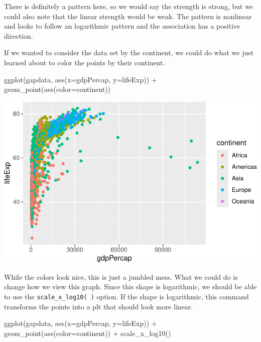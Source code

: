 \documentclass[
  letterpaper,
  DIV=11,
  numbers=noendperiod]{scrreprt}
\newenvironment{Shaded}{\begin{snugshade}}{\end{snugshade}}
\newcommand{\AttributeTok}[1]{\textcolor[rgb]{0.40,0.45,0.13}{#1}}
\newcommand{\FunctionTok}[1]{\textcolor[rgb]{0.28,0.35,0.67}{#1}}
\newcommand{\NormalTok}[1]{\textcolor[rgb]{0.00,0.23,0.31}{#1}}
\newcommand{\SpecialCharTok}[1]{\textcolor[rgb]{0.37,0.37,0.37}{#1}}
\begin{document}
There is definitely a pattern here, so we would say the strength is
strong, but we could also note that the linear strength would be weak.
The pattern is nonlinear and looks to follow an logarithmic pattern and
the association has a positive direction.

If we wanted to consider the data set by the continent, we could do what
we just learned about to color the points by their continent.

\begin{Shaded}
\begin{Highlighting}[]
  \FunctionTok{ggplot}\NormalTok{(gapdata, }\FunctionTok{aes}\NormalTok{(}\AttributeTok{x=}\NormalTok{gdpPercap, }\AttributeTok{y=}\NormalTok{lifeExp)) }\SpecialCharTok{+}
  \FunctionTok{geom\_point}\NormalTok{(}\FunctionTok{aes}\NormalTok{(}\AttributeTok{color=}\NormalTok{continent))}
\end{Highlighting}
\end{Shaded}

\includegraphics{Advanced_Scatterplot_Techniques_files/figure-pdf/unnamed-chunk-15-1.pdf}

While the colors look nice, this is just a jumbled mess. What we could
do is change how we view this graph. Since this shape is logarithmic, we
should be able to use the \texttt{scale\_x\_log10(\ )} option. If the
shape is logarithmic, this command transforms the points into a plt that
should look more linear.

\begin{Shaded}
\begin{Highlighting}[]
  \FunctionTok{ggplot}\NormalTok{(gapdata, }\FunctionTok{aes}\NormalTok{(}\AttributeTok{x=}\NormalTok{gdpPercap, }\AttributeTok{y=}\NormalTok{lifeExp)) }\SpecialCharTok{+}
  \FunctionTok{geom\_point}\NormalTok{(}\FunctionTok{aes}\NormalTok{(}\AttributeTok{color=}\NormalTok{continent)) }\SpecialCharTok{+}
  \FunctionTok{scale\_x\_log10}\NormalTok{()}
\end{Highlighting}
\end{Shaded}
\end{document}
